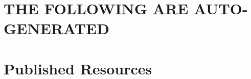 \documentclass[11pt]{article}
\newcommand{\rqparent}{}
\newcommand{\rqgroup}[2]{\gdef\rqparent{\section{#1}\label{#2}\gdef\rqparent{}}}
\begin{document}
\clearpage
\section{THE FOLLOWING ARE AUTO-GENERATED}
%
%
%
%
%
%

\rqgroup{Agreement Analyses}{app:agreement}




%


%


\rqgroup{Anticipation Analyses}{app:anticipation}


%


\rqgroup{(Sub)benchmark Selection Analyses}{app:selection}

%
%

\clearpage
\section{Published Resources}

%
\end{document}
